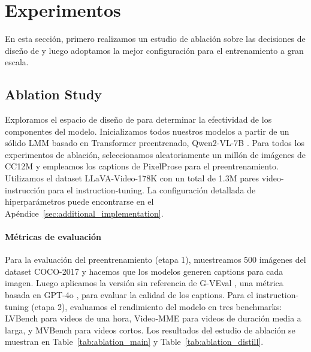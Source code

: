 
\section{Experimentos}
En esta sección, primero realizamos un estudio de ablación sobre las decisiones de diseño de \model y luego adoptamos la mejor configuración para el entrenamiento a gran escala.
\subsection{Ablation Study}
Exploramos el espacio de diseño de \model para determinar la efectividad de los componentes del modelo. Inicializamos todos nuestros modelos a partir de un sólido LMM basado en Transformer preentrenado, Qwen2-VL-7B \cite{wang2024qwen2}. Para todos los experimentos de ablación, seleccionamos aleatoriamente un millón de imágenes de CC12M \cite{changpinyo2021conceptual} y empleamos los captions de PixelProse \cite{singla2024pixels} para el preentrenamiento. Utilizamos el dataset LLaVA-Video-178K \cite{zhang2024video} con un total de 1.3M pares video-instrucción para el instruction-tuning. La configuración detallada de hiperparámetros puede encontrarse en el Apéndice~\ref{sec:additional_implementation}.




\vspace{-1em}
\paragraph{Métricas de evaluación} Para la evaluación del preentrenamiento (etapa 1), muestreamos 500 imágenes del dataset COCO-2017 \cite{chen2015microsoft} y hacemos que los modelos generen captions para cada imagen. Luego aplicamos la versión sin referencia de G-VEval \cite{tong2024g}, una métrica basada en GPT-4o \cite{OpenAI_GPT4o}, para evaluar la calidad de los captions. Para el instruction-tuning (etapa 2), evaluamos el rendimiento del modelo en tres benchmarks: LVBench \cite{wang2024lvbench} para videos de una hora, Video-MME \cite{fu2024video} para videos de duración media a larga, y MVBench \cite{li2024mvbench} para videos cortos. Los resultados del estudio de ablación se muestran en Table~\ref{tab:ablation_main} y Table~\ref{tab:ablation_distill}.


